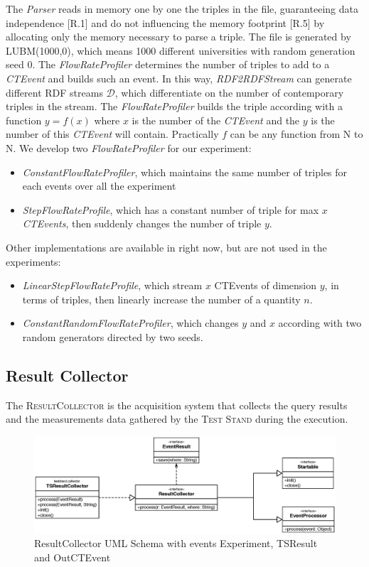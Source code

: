The \textit{Parser} reads in memory one by one the triples in the file, guaranteeing data independence [R.1] and do not influencing the memory footprint [R.5] by allocating only the memory necessary to parse a triple. The file is generated by LUBM(1000,0), which means 1000 different universities with random generation seed 0. 
The \textit{FlowRateProfiler} determines the number of triples to add to a \textit{CTEvent} and builds such an event. In this way, \textit{RDF2RDFStream} can generate different RDF streams $\mathcal{D}$, which differentiate on the number of contemporary triples in the stream. The \textit{FlowRateProfiler} builds the triple according with a function $y=f(x)$ where $x$ is the number of the \textit{CTEvent} and the $y$ is the number of this \textit{CTEvent} will contain. Practically $f$ can be any function from N to N. We develop two \textit{FlowRateProfiler} for our experiment: 
\begin{itemize}
\item \textit{ConstantFlowRateProfiler}, which maintains the same number of triples for each events over all the experiment  
\item \textit{StepFlowRateProfile}, which has a constant number of triple for max $x$ \textit{CTEvents}, then suddenly changes the number of triple $y$.
\end{itemize}
Other implementations are available in \name right now, but are not used in the experiments:
\begin{itemize}
\item \textit{LinearStepFlowRateProfile}, which stream $x$ CTEvents of dimension $y$, in terms of triples, then linearly increase the number of a quantity $n$.
\item \textit{ConstantRandomFlowRateProfiler}, which changes $y$ and $x$ according with two random generators directed by two seeds.
\end{itemize}

\subsection{Result Collector} 

\noindent The \textsc{ResultCollector} is the acquisition system that collects the query results and the measurements data gathered by the \textsc{Test Stand} during the execution.

\begin{figure}[tbh]
  \centering
	\includegraphics[width=\linewidth]{images/uml_resultcollector}
	\caption{ResultCollector UML Schema with events Experiment, TSResult and OutCTEvent} 
  	\label{fig:uml_resultcollector}
\end{figure}

